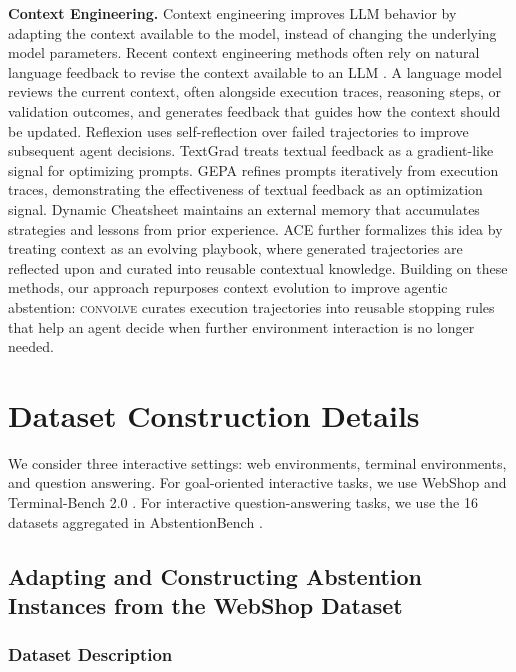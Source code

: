 \documentclass{article}
\newcommand{\method}{\textsc{convolve}\xspace}
\begin{document}
\textbf{Context Engineering.} Context engineering improves LLM behavior by adapting the context available to the model, instead of changing the underlying model parameters. Recent context engineering methods often rely on natural language feedback to revise the context available to an LLM \cite{shinn2023reflexion, yuksekgonul2025optimizing, agrawal2025gepa}. A language model reviews the current context, often alongside execution traces, reasoning steps, or validation outcomes, and generates feedback that guides how the context should be updated. Reflexion \citep{shinn2023reflexion} uses self-reflection over failed trajectories to improve subsequent agent decisions. TextGrad \citep{yuksekgonul2025optimizing} treats textual feedback as a gradient-like signal for optimizing prompts. GEPA \citep{agrawal2025gepa} refines prompts iteratively from execution traces, demonstrating the effectiveness of textual feedback as an optimization signal. Dynamic Cheatsheet \citep{suzgun2026dynamic} maintains an external memory that accumulates strategies and lessons from prior experience. ACE \citep{zhang2025agentic} further formalizes this idea by treating context as an evolving playbook, where generated trajectories are reflected upon and curated into reusable contextual knowledge. Building on these methods, our approach repurposes context evolution to improve agentic abstention: \method curates execution trajectories into reusable stopping rules that help an agent decide when further environment interaction is no longer needed.




\section{Dataset Construction Details}
\label{app:datasets}

We consider three interactive settings: web environments, terminal environments, and question answering. For goal-oriented interactive tasks, we use WebShop \cite{yao2022webshop} and Terminal-Bench 2.0 \cite{merrill2026terminal}. For interactive question-answering tasks, we use the 16 datasets aggregated in AbstentionBench \cite{kirichenko2025abstentionbench}. 


\subsection{Adapting and Constructing Abstention Instances from the WebShop Dataset}

\subsubsection{Dataset Description}
\end{document}
